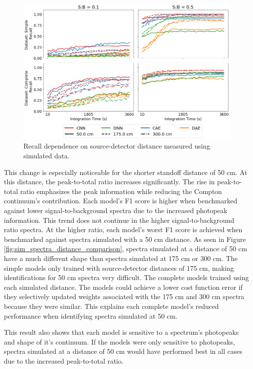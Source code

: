 \begin{figure}[H]
	\centering
	\includegraphics[width=1.0\linewidth]{images/sim-generalization-dist-recall}
	\caption{Recall dependence on source-detector distance measured using simulated data.}
	\label{fig:sim-generalization-dist-recall}
\end{figure}


This change is especially noticeable for the shorter standoff distance of 50 cm. At this distance, the peak-to-total ratio increases significantly. The rise in peak-to-total ratio emphasizes the peak information while reducing the Compton continuum's contribution. Each model's F1 score is higher when benchmarked against lower signal-to-background spectra due to the increased photopeak information. This trend does not continue in the higher signal-to-background ratio spectra. At the higher ratio, each model's worst F1 score is achieved when benchmarked against spectra simulated with a 50 cm distance. As seen in Figure \ref{fig:sim_spectra_distance_comparison}, spectra simulated at a distance of 50 cm have a much different shape than spectra simulated at 175 cm or 300 cm. The simple models only trained with source-detector distances of 175 cm, making identifications for 50 cm spectra very difficult. The complete models trained using each simulated distance. The models could achieve a lower cost function error if they selectively updated weights associated with the 175 cm and 300 cm spectra because they were similar. This explains each complete model's reduced performance when identifying spectra simulated at 50 cm. 

This result also shows that each model is sensitive to a spectrum's photopeaks and shape of it's continuum. If the models were only sensitive to photopeaks, spectra simulated at a distance of 50 cm would have performed best in all cases due to the increased peak-to-total ratio.



